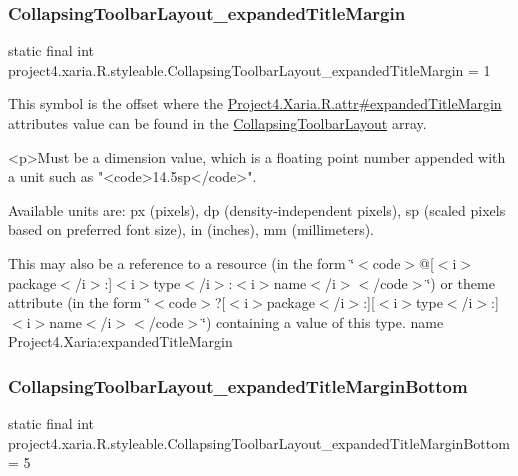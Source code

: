 \subsubsection{\texorpdfstring{Collapsing\+Toolbar\+Layout\+\_\+expanded\+Title\+Margin}{CollapsingToolbarLayout\_expandedTitleMargin}}
{\footnotesize\ttfamily static final int project4.\+xaria.\+R.\+styleable.\+Collapsing\+Toolbar\+Layout\+\_\+expanded\+Title\+Margin = 1\hspace{0.3cm}{\ttfamily [static]}}

This symbol is the offset where the \hyperlink{}{Project4.\+Xaria.\+R.\+attr\#expanded\+Title\+Margin} attribute\textquotesingle{}s value can be found in the \hyperlink{classproject4_1_1xaria_1_1R_1_1styleable_ac131ed2b7e0e7f05b58231242478b839}{Collapsing\+Toolbar\+Layout} array.

\begin{DoxyVerb}      <p>Must be a dimension value, which is a floating point number appended with a unit such as "<code>14.5sp</code>".
\end{DoxyVerb}
 Available units are\+: px (pixels), dp (density-\/independent pixels), sp (scaled pixels based on preferred font size), in (inches), mm (millimeters). 

This may also be a reference to a resource (in the form \char`\"{}$<$code$>$@\mbox{[}$<$i$>$package$<$/i$>$\+:\mbox{]}$<$i$>$type$<$/i$>$\+:$<$i$>$name$<$/i$>$$<$/code$>$\char`\"{}) or theme attribute (in the form \char`\"{}$<$code$>$?\mbox{[}$<$i$>$package$<$/i$>$\+:\mbox{]}\mbox{[}$<$i$>$type$<$/i$>$\+:\mbox{]}$<$i$>$name$<$/i$>$$<$/code$>$\char`\"{}) containing a value of this type.  name Project4.\+Xaria\+:expanded\+Title\+Margin \mbox{\label{classproject4_1_1xaria_1_1R_1_1styleable_ab15616401f9effe51d0c5ab4df6399a5}} 
\subsubsection{\texorpdfstring{Collapsing\+Toolbar\+Layout\+\_\+expanded\+Title\+Margin\+Bottom}{CollapsingToolbarLayout\_expandedTitleMarginBottom}}
{\footnotesize\ttfamily static final int project4.\+xaria.\+R.\+styleable.\+Collapsing\+Toolbar\+Layout\+\_\+expanded\+Title\+Margin\+Bottom = 5\hspace{0.3cm}{\ttfamily [static]}}

